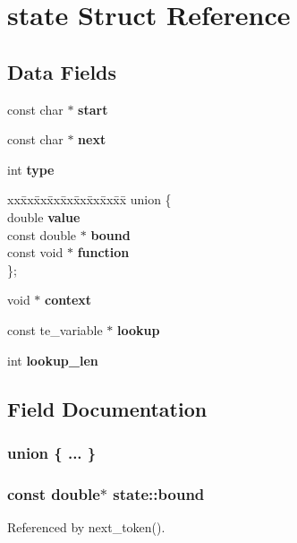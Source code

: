 \section{state Struct Reference}
\label{structstate}
\subsection*{Data Fields}
\begin{DoxyCompactItemize}
\item 
const char $\ast$ {\bf start}
\item 
const char $\ast$ {\bf next}
\item 
int {\bf type}
\item 
\begin{tabbing}
xx\=xx\=xx\=xx\=xx\=xx\=xx\=xx\=xx\=\kill
union \{\\
\>double {\bf value}\\
\>const double $\ast$ {\bf bound}\\
\>const void $\ast$ {\bf function}\\
\}; \\

\end{tabbing}\item 
void $\ast$ {\bf context}
\item 
const te\+\_\+variable $\ast$ {\bf lookup}
\item 
int {\bf lookup\+\_\+len}
\end{DoxyCompactItemize}


\subsection{Field Documentation}
\subsubsection[{"@7}]{\setlength{\rightskip}{0pt plus 5cm}union \{ ... \} }\label{structstate_afcd30bba28908f5d4f440d96e3162b5b}
\subsubsection[{bound}]{\setlength{\rightskip}{0pt plus 5cm}const double$\ast$ state\+::bound}\label{structstate_a36522140e6ff24a436e1a6cbd44481c3}


Referenced by next\+\_\+token().

